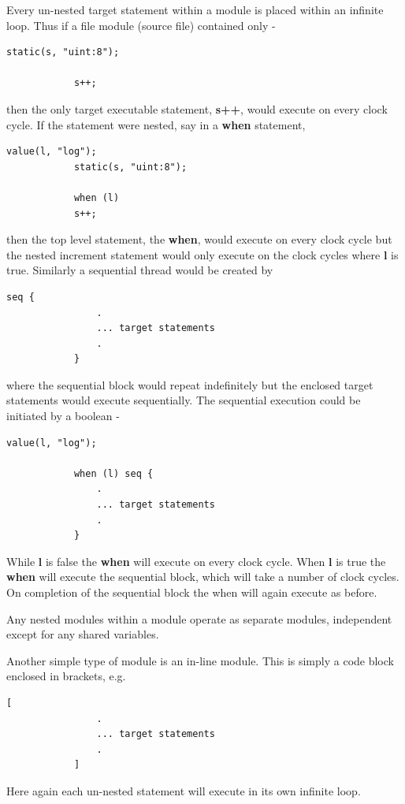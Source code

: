         
        Every un-nested target statement within a module is placed within an
        infinite loop. Thus if a file module (source file) contained only -
        \begin{lstlisting}[gobble=12, language=threepl]
            static(s, "uint:8");
           
            s++;
        \end{lstlisting}
        then the only target executable statement, {\bf s++}, would execute on
        every clock cycle. If the statement were nested, say in a {\bf when}
        statement,
        \begin{lstlisting}[gobble=12, language=threepl]
            value(l, "log");
            static(s, "uint:8");
           
            when (l)
            s++;
        \end{lstlisting}
        then the top level statement, the {\bf when}, would execute on every clock
        cycle but the nested increment statement would only execute on the clock
        cycles where {\bf l} is true. Similarly a sequential thread would be created
        by
        \begin{lstlisting}[gobble=12, language=threepl]           
            seq {
                .
                ... target statements
                .
            }
        \end{lstlisting}
        where the sequential block would repeat indefinitely but the enclosed
        target statements would execute sequentially. The sequential execution
        could be initiated by a boolean -
        \begin{lstlisting}[gobble=12, language=threepl]           
            value(l, "log");
            
            when (l) seq {
                .
                ... target statements
                .
            }
        \end{lstlisting}
        While {\bf l} is false the {\bf when} will execute on every clock cycle.
        When {\bf l} is true the {\bf when} will execute the sequential block,
        which will take a number of clock cycles. On completion of the sequential
        block the when will again execute as before.
        
        Any nested modules within a module operate as separate modules,
        independent except for any shared variables.
        
        Another simple type of module is an in-line module. This is simply
        a code block enclosed in brackets, e.g.
        \begin{lstlisting}[gobble=12, language=threepl]           
            [
                .
                ... target statements
                .
            ]
        \end{lstlisting}
        Here again each un-nested statement will execute in its own infinite loop.
        
